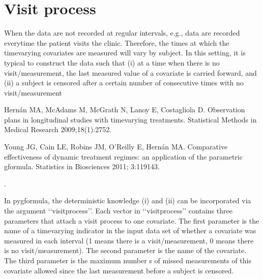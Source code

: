 \documentclass[letterpaper,10pt,english]{sphinxmanual}
\begin{document}
\section{Visit process}
\label{\detokenize{Specifications/Visit process:visit-process}}\label{\detokenize{Specifications/Visit process:id1}}\label{\detokenize{Specifications/Visit process::doc}}
\sphinxAtStartPar
When the data are not recorded at regular intervals, e.g., data are recorded everytime the patient visits the clinic.
Therefore, the times at which the time\sphinxhyphen{}varying covariates are measured will vary by subject. In this setting,
it is typical to construct the data such that (i) at a time when there is no visit/measurement,
the last measured value of a covariate is carried forward, and (ii) a subject is censored after a certain number of consecutive times
with no visit/measurement \sphinxstepexplicit %
\begin{footnote}[1]\label{\thesphinxscope.1}%
\sphinxAtStartFootnote
Hernán MA, McAdams M, McGrath N, Lanoy E, Costagliola D. Observation plans in longitudinal studies with
time\sphinxhyphen{}varying treatments. Statistical Methods in Medical Research 2009;18(1):27\sphinxhyphen{}52.
%
\end{footnote} \sphinxstepexplicit %
\begin{footnote}[2]\label{\thesphinxscope.2}%
\sphinxAtStartFootnote
Young JG, Cain LE, Robins JM, O’Reilly E, Hernán MA. Comparative effectiveness of dynamic treatment regimes:
an application of the parametric g\sphinxhyphen{}formula. Statistics in Biosciences 2011; 3:119\sphinxhyphen{}143.
%
\end{footnote}.

\sphinxAtStartPar
In pygformula, the deterministic knowledge (i) and (ii) can be incorporated via the argument ‘‘visitprocess’’.
Each vector in ‘‘visitprocess’’ contains three parameters that attach a visit process to one covariate.
The first parameter is the name of a time\sphinxhyphen{}varying indicator in the input data set of whether a covariate was measured in each interval
(1 means there is a visit/measurement, 0 means there is no visit/measurement).
The second parameter is the name of the covariate. The third parameter is the maximum number s of missed measurements of this covariate allowed
since the last measurement before a subject is censored.
\end{document}
